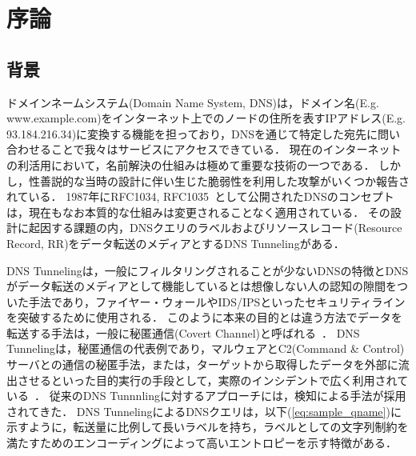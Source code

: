 \section{序論}
\subsection{背景}
ドメインネームシステム(Domain Name System, DNS)は，ドメイン名(E.g. www.example.com)をインターネット上でのノードの住所を表すIPアドレス(E.g. 93.184.216.34)に変換する機能を担っており，DNSを通じて特定した宛先に問い合わせることで我々はサービスにアクセスできている．
現在のインターネットの利活用において，名前解決の仕組みは極めて重要な技術の一つである．
しかし，性善説的な当時の設計に伴い生じた脆弱性を利用した攻撃がいくつか報告されている．
1987年にRFC1034, RFC1035~\cite{rfc1034, rfc1035}として公開されたDNSのコンセプトは，現在もなお本質的な仕組みは変更されることなく適用されている．
その設計に起因する課題の内，DNSクエリのラベルおよびリソースレコード(Resource Record, RR)をデータ転送のメディアとするDNS Tunnelingがある．

DNS Tunnelingは，一般にフィルタリングされることが少ないDNSの特徴とDNSがデータ転送のメディアとして機能しているとは想像しない人の認知の隙間をついた手法であり，ファイヤー・ウォールやIDS/IPSといったセキュリティラインを突破するために使用される．
このように本来の目的とは違う方法でデータを転送する手法は，一般に秘匿通信(Covert Channel)と呼ばれる~\cite{covertchannel}．
DNS Tunnelingは，秘匿通信の代表例であり，マルウェアとC2(Command \& Control)サーバとの通信の秘匿手法，または，ターゲットから取得したデータを外部に流出させるといった目的実行の手段として，実際のインシデントで広く利用されている~\cite{frameworkpos, bondupdater, bernhardpos, multigrainpos, pisloader, denis, dnsmessenger, udpos}．
従来のDNS Tunnnlingに対するアプローチには，検知による手法が採用されてきた．
DNS TunnelingによるDNSクエリは，以下(\ref{eq:sample_qname})に示すように，転送量に比例して長いラベルを持ち，ラベルとしての文字列制約を満たすためのエンコーディングによって高いエントロピーを示す特徴がある．

